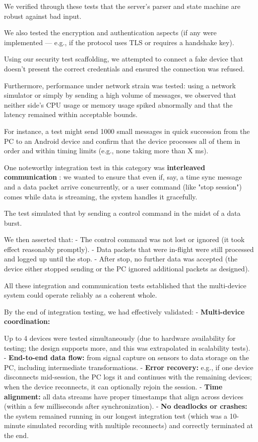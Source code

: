 {{{We verified through these tests that the server's parser and state machine are robust against bad input.

We also tested the encryption and authentication aspects (if any were implemented --- e.g., if the protocol uses TLS or requires a handshake key).

Using our security test scaffolding, we attempted to connect a fake device that doesn't present the correct credentials and ensured the connection was refused.

Furthermore, performance under network strain was tested: using a network simulator or simply by sending a high volume of messages, we observed that neither side's CPU usage or memory usage spiked abnormally and that the latency remained within acceptable bounds.

For instance, a test might send 1000 small messages in quick succession from the PC to an Android device and confirm that the device processes all of them in order and within timing limits (e.g., none taking more than X ms).

One noteworthy integration test in this category was \textbf{interleaved communication}
: we wanted to ensure that even if, say, a time sync message and a data packet arrive concurrently, or a user command (like "stop session") comes while data is streaming, the system handles it gracefully.

The test simulated that by sending a control command in the midst of a data burst.

We then asserted that: - The control command was not lost or ignored (it took effect reasonably promptly). - Data packets that were in-flight were still processed and logged up until the stop. - After stop, no further data was accepted (the device either stopped sending or the PC ignored additional packets as designed).

All these integration and communication tests established that the multi-device system could operate reliably as a coherent whole.

By the end of integration testing, we had effectively validated: - \textbf{Multi-device coordination:}

Up to 4 devices were tested simultaneously (due to hardware availability for testing; the design supports more, and this was extrapolated in scalability tests). - \textbf{End-to-end data flow:}
 from signal capture on sensors to data storage on the PC, including intermediate transformations. - \textbf{Error recovery:}
 e.g., if one device disconnects mid-session, the PC logs it and continues with the remaining devices; when the device reconnects, it can optionally rejoin the session. - \textbf{Time alignment:}
 all data streams have proper timestamps that align across devices (within a few milliseconds after synchronization). - \textbf{No deadlocks or crashes:}
 the system remained running in our longest integration test (which was a 10-minute simulated recording with multiple reconnects) and correctly terminated at the end.

}}}
